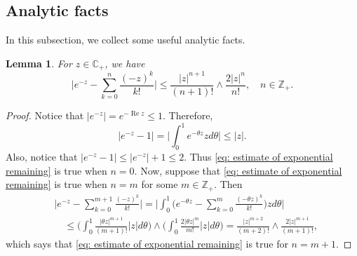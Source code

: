 \documentclass[12pt,a4paper]{amsart}
\theoremstyle{plain}
\newtheorem{lem}[thm]{Lemma}
\theoremstyle{definition}
\numberwithin{equation}{section}
\begin{document}
    
    
\appendix
\section{ }

\subsection{Analytic facts}
    In this subsection, we collect some useful analytic facts.
\begin{lem}
\label{lem: estimate of exponential remaining}
    For $z\in \mathbb C_+$,  we have
\begin{equation}
\label{eq: estimate of exponential remaining}
    \Big|e^{-z} - \sum_{k=0}^n \frac{(-z)^k}{k!} \Big|
    \leq \frac{|z|^{n+1}}{(n+1)!} \wedge \frac{2|z|^{n}}{n!}, \quad n\in \mathbb Z_+.
\end{equation}
\end{lem}
\begin{proof}
    Notice that $|e^{-z}| = e^{- \operatorname{Re} z} \leq 1$.
    Therefore,
\begin{equation}
    |e^{-z} - 1|
    = \Big| \int_0^1 e^{-\theta z} z d\theta\Big|
    \leq |z|.
\end{equation}
    Also, notice that $|e^{-z} - 1| \leq |e^{-z}|+1 \leq 2$.
    Thus \eqref{eq: estimate of exponential remaining} is true when $n = 0$.
    Now, suppose that \eqref{eq: estimate of exponential remaining} is true when $n = m$ for some $m \in \mathbb Z_+$.
    Then
\begin{align}
    &\Big|e^{-z} - \sum_{k=0}^{m+1} \frac{(-z)^k}{k!}\Big|
    = \Big| \int_0^1\Big(e^{-\theta z} - \sum_{k=0}^m \frac{(-\theta z)^k}{k!} \Big) z d\theta \Big|
    \\&\quad \leq  \Big(\int_0^1 \frac{|\theta z|^{m+1}}{(m+1)!} |z| d\theta\Big) \wedge \Big(\int_0^1 \frac{2|\theta z|^{m}}{m!} |z| d\theta\Big)
    = \frac{|z|^{m+2}}{(m+2)!} \wedge \frac{2|z|^{m+1}}{(m+1)!},
\end{align}
    which says that \eqref{eq: estimate of exponential remaining} is true for $n = m + 1$.
\end{proof}
\end{document}
